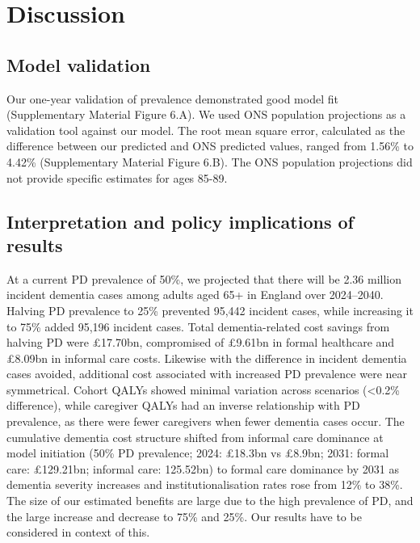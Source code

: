 \documentclass[11pt,a4paper]{article}
\begin{document}
\section{Discussion}

\subsection{Model validation}

Our one-year validation of prevalence demonstrated good model fit (Supplementary Material Figure 6.A). We used ONS population projections as a validation tool against our model. The root mean square error, calculated as the difference between our predicted and ONS predicted values, ranged from 1.56\% to 4.42\% (Supplementary Material Figure 6.B). The ONS population projections did not provide specific estimates for ages 85-89.

\subsection{Interpretation and policy implications of results}

At a current PD prevalence of 50\%, we projected that there will be 2.36 million incident dementia cases among adults aged 65+ in England over 2024--2040. Halving PD prevalence to 25\% prevented 95,442 incident cases, while increasing it to 75\% added 95,196 incident cases. Total dementia-related cost savings from halving PD were \pounds17.70bn, compromised of \pounds9.61bn in formal healthcare and \pounds8.09bn in informal care costs. Likewise with the difference in incident dementia cases avoided, additional cost associated with increased PD prevalence were near symmetrical. Cohort QALYs showed minimal variation across scenarios (<0.2\% difference), while caregiver QALYs had an inverse relationship with PD prevalence, as there were fewer caregivers when fewer dementia cases occur. The cumulative dementia cost structure shifted from informal care dominance at model initiation  (50\% PD prevalence; 2024: \pounds18.3bn vs \pounds8.9bn; 2031: formal care: \pounds129.21bn; informal care: 125.52bn) to formal care dominance by 2031 as dementia severity increases and institutionalisation rates rose from 12\% to 38\%. The size of our estimated benefits are large due to the high prevalence of PD, and the large increase and decrease to 75\% and 25\%. Our results have to be considered in context of this.
\end{document}
